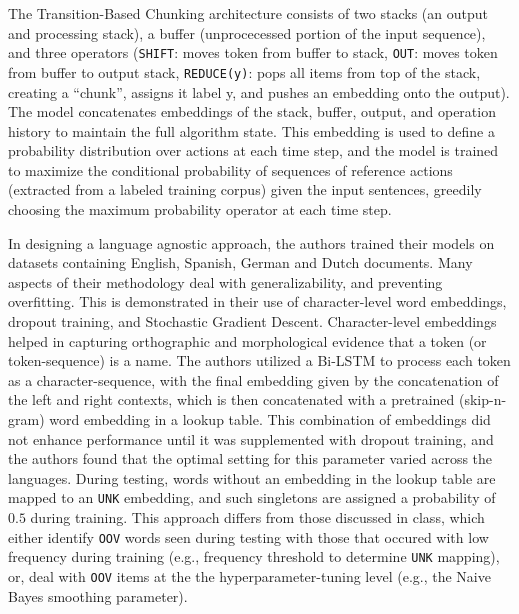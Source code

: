 \documentclass[11pt]{article}
\begin{document}

The Transition-Based Chunking architecture
consists of two stacks (an output 
and processing stack), 
a buffer (unprocecessed
portion of the input sequence), and three
operators (\texttt{SHIFT}: moves token from
buffer to stack, \texttt{OUT}: moves token from buffer 
to output stack, \texttt{REDUCE(y)}: pops all items from
top of the stack, creating a “chunk”, assigns it label y, 
and pushes an embedding onto the output). 
The model concatenates embeddings of 
the stack, buffer, output, 
and operation history to maintain
the full algorithm state.
This embedding is used to define a 
probability distribution over actions 
at each time step, and the model is trained 
to maximize the conditional probability of
sequences of reference actions 
(extracted from a labeled training corpus) 
given the input sentences, greedily choosing
the maximum probability operator at each time step. 



In designing a language agnostic approach,
the authors trained their models on datasets 
containing English, Spanish, 
German and Dutch documents. Many aspects
of their methodology deal with generalizability, 
and preventing overfitting. This is demonstrated 
in their use of character-level word embeddings, 
dropout training,
and Stochastic Gradient Descent.
Character-level embeddings helped
in capturing orthographic and 
morphological evidence that a token 
(or token-sequence) is a name.
The authors utilized a Bi-LSTM
to process each token as a character-sequence,
with the final embedding given by the concatenation 
of the left and right contexts, which is then 
concatenated with a pretrained (skip-n-gram) 
word embedding in a lookup table.
This combination of embeddings did not enhance 
performance until it was supplemented with dropout 
training, and the authors found that the optimal
setting for this parameter varied across the languages.
During testing, 
words without an embedding in the
lookup table are mapped to an \texttt{UNK}
embedding, and such singletons
are assigned a probability of $0.5$ during training.
This approach differs from those discussed in
class, which either identify \texttt{OOV} words seen
during testing with those that occured
with low frequency during training (e.g., frequency threshold
to determine \texttt{UNK} mapping), 
or, deal with \texttt{OOV} items at the the hyperparameter-tuning level 
(e.g., the Naive Bayes smoothing parameter).
\end{document}
